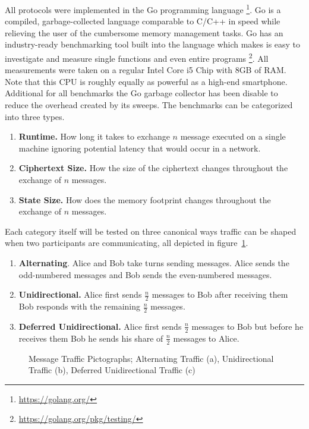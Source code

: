 \documentclass[11pt,a4paper,twoside,openright,bibliography=totoc]{scrbook}
\begin{document}
All protocols were implemented in the Go programming
language \footnote{\url{https://golang.org/}}. Go is a compiled,
garbage-collected language comparable to C/C++ in speed
while relieving the user of the cumbersome memory management
tasks. Go has an industry-ready benchmarking tool built
into the language which makes is easy to investigate and
measure single functions and even entire
programs \footnote{\url{https://golang.org/pkg/testing/}}.
All measurements were taken on a regular Intel Core i5 Chip
with 8GB of RAM. Note that this CPU is roughly equally as
powerful as a high-end smartphone. Additional for all benchmarks
the Go garbage collector has been disable to reduce the
overhead created by its sweeps.
The benchmarks can be categorized into three types.
\begin{enumerate}
\item \textbf{Runtime.} How long it takes to exchange $n$ message executed
  on a single machine ignoring potential latency that would occur
  in a network.
\item \textbf{Ciphertext Size.} How the size of the ciphertext changes
  throughout the exchange of $n$ messages.
\item \textbf{State Size.} How does the memory footprint changes
  throughout the exchange of $n$ messages.
\end{enumerate}
Each category itself will be tested on three canonical ways
traffic can be shaped when two participants are communicating,
all depicted in figure~\ref{fig:picto}.
\begin{enumerate}
\item \textbf{Alternating}. Alice and Bob take turns sending messages. Alice
  sends the odd-numbered messages and Bob sends the even-numbered messages.
\item \textbf{Unidirectional.} Alice first sends $\frac{n}{2}$ messages
  to Bob after receiving them Bob responds with the remaining $\frac{n}{2}$ messages.
\item \textbf{Deferred Unidirectional.} Alice first sends $\frac{n}{2}$ messages
  to Bob but before he receives them Bob he sends his share of $\frac{n}{2}$
  messages to Alice.
\end{enumerate}

\begin{figure}[H]
  \centering
  \noindent\begin{subfigure}[t]{0.32\linewidth}
    \centering
    
    \caption{}
  \end{subfigure}%
  \begin{subfigure}[t]{0.32\linewidth}
    \centering
    
    \caption{}
  \end{subfigure}%
  \begin{subfigure}[t]{0.32\linewidth}
    \centering
    
    \caption{}
  \end{subfigure}
  \caption[Message Traffic Pictographs]{Message Traffic Pictographs;
    Alternating Traffic (a), Unidirectional
    Traffic (b), Deferred Unidirectional Traffic (c)}
  \label{fig:picto}
\end{figure}
\end{document}
